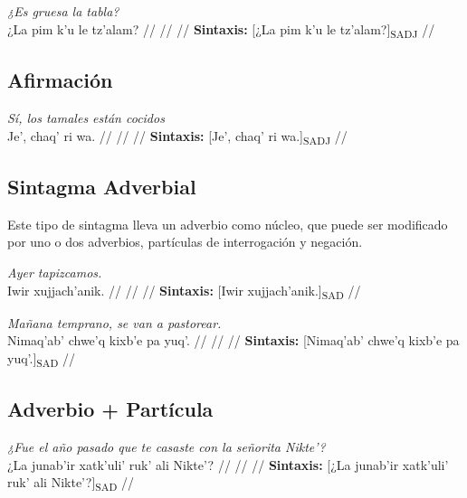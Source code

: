 \documentclass{article}%
\begin{document}
%
\par\medskip%
\ex
\textit{¿Es gruesa la tabla?} \\
\begingl
\gla ¿La pim k'u le tz'alam? //
\glb  //
\glc  //
\glft \textbf{Sintaxis:} [¿La pim k'u le tz'alam?]\textsubscript{SADJ} //
\endgl
\xe
%
\medskip%
\subsection{Afirmación}%
\label{subsec:Afirmacin}%

%
\par\medskip%
\ex
\textit{Sí, los tamales están cocidos} \\
\begingl
\gla Je', chaq' ri wa. //
\glb  //
\glc  //
\glft \textbf{Sintaxis:} [Je', chaq' ri wa.]\textsubscript{SADJ} //
\endgl
\xe
%
\medskip%
\subsection{Sintagma Adverbial}%
\label{subsec:SintagmaAdverbial}%

%
Este tipo de sintagma lleva un adverbio como núcleo, que puede ser modificado por uno %
o dos adverbios, partículas de interrogación y negación. %
\par\medskip%
\ex
\textit{Ayer tapizcamos.} \\
\begingl
\gla Iwir xujjach'anik. //
\glb  //
\glc  //
\glft \textbf{Sintaxis:} [Iwir xujjach'anik.]\textsubscript{SAD} //
\endgl
\xe
%
\medskip%
\par\medskip%
\ex
\textit{Mañana temprano, se van a pastorear.} \\
\begingl
\gla Nimaq'ab' chwe'q kixb'e pa yuq'. //
\glb  //
\glc  //
\glft \textbf{Sintaxis:} [Nimaq'ab' chwe'q kixb'e pa yuq'.]\textsubscript{SAD} //
\endgl
\xe
%
\medskip%
\subsection{Adverbio + Partícula}%
\label{subsec:Adverbio+Partcula}%

%
\par\medskip%
\ex
\textit{¿Fue el año pasado que te casaste con la señorita Nikte'?} \\
\begingl
\gla ¿La junab'ir xatk'uli' ruk' ali Nikte'? //
\glb  //
\glc  //
\glft \textbf{Sintaxis:} [¿La junab'ir xatk'uli' ruk' ali Nikte'?]\textsubscript{SAD} //
\endgl
\xe
%
\medskip

%
\end{document}
